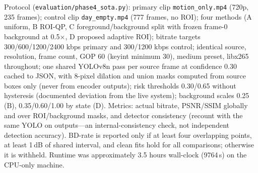 Protocol (\texttt{evaluation/phase4\_sota.py}): primary clip \texttt{motion\_only.mp4} (720p, 235 frames); control clip \texttt{day\_empty.mp4} (777 frames, no ROI); four methods (A uniform, B ROI-QP, C foreground/background split with frozen frame-0 background at 0.5$\times$, D proposed adaptive ROI); bitrate targets 300/600/1200/2400 kbps primary and 300/1200 kbps control; identical source, resolution, frame count, GOP 60 (keyint minimum 30), medium preset, libx265 throughout; one shared YOLOv8n pass per source frame at confidence 0.30 cached to JSON, with 8-pixel dilation and union masks computed from source boxes only (never from encoder outputs); risk thresholds 0.30/0.65 without hysteresis (documented deviation from the live system); background scales 0.25 (B), 0.35/0.60/1.00 by state (D). Metrics: actual bitrate, PSNR/SSIM globally and over ROI/background masks, and detector consistency (recount with the same YOLO on outputs---an internal-consistency check, not independent detection accuracy). BD-rate is reported only if at least four overlapping points, at least 1\,dB of shared interval, and clean fits hold for all comparisons; otherwise it is withheld. Runtime was approximately 3.5 hours wall-clock (9764\,s) on the CPU-only machine.
